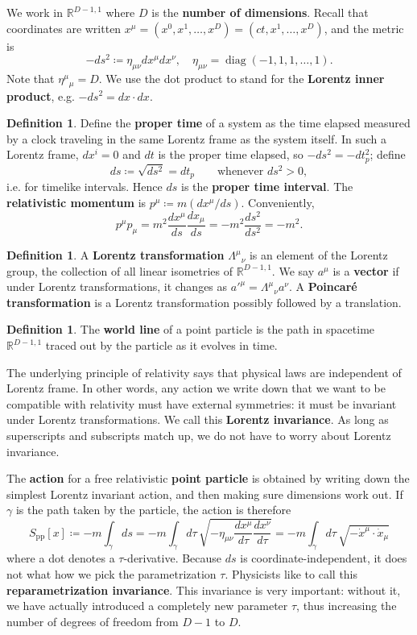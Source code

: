 \documentclass{report}
\theoremstyle{plain}
\theoremstyle{definition}
\newtheorem{definition}[theorem]{Definition}
\theoremstyle{remark}
\newcommand{\bR}{\mathbb{R}}
\DeclareMathOperator{\diag}{diag}
\newcommand{\pp}{\text{pp}}
\newcommand{\dder}[2]{\frac{d #1}{d #2}}
\begin{document}
We work in $\bR^{D-1,1}$ where $D$ is the {\bf number of dimensions}.
Recall that coordinates are written $x^\mu = (x^0, x^1, \ldots, x^D) =
(ct, x^1, \ldots, x^D)$, and the metric is
\[ -ds^2 \coloneqq \eta_{\mu\nu} dx^\mu dx^\nu, \quad \eta_{\mu\nu} = \diag(-1, 1, 1, \ldots, 1). \]
Note that $\eta^\mu{}_\mu = D$. We use the dot product to stand for
the {\bf Lorentz inner product}, e.g. $-ds^2 = dx \cdot dx$.

\begin{definition}
  Define the {\bf proper time} of a system as the time elapsed
  measured by a clock traveling in the same Lorentz frame as the
  system itself. In such a Lorentz frame, $dx^i = 0$ and $dt$ is the
  proper time elapsed, so $-ds^2 = -dt_p^2$; define
  \[ ds \coloneqq \sqrt{ds^2} = dt_p \qquad \text{whenever } ds^2 > 0, \]
  i.e. for timelike intervals. Hence $ds$ is the {\bf proper time
    interval}. The {\bf relativistic momentum} is $p^\mu \coloneqq
  m(dx^\mu/ds)$. Conveniently,
  \[ p^\mu p_\mu = m^2\dder{x^\mu}{s} \dder{x_\mu}{s} = -m^2 \dder{s^2}{s^2} = -m^2. \]
\end{definition}

\begin{definition}
  A {\bf Lorentz transformation} $\Lambda^\mu{}_\nu$ is an element of
  the Lorentz group, the collection of all linear isometries of
  $\bR^{D-1,1}$. We say $a^\mu$ is a {\bf vector} if under Lorentz
  transformations, it changes as $a'^\mu = \Lambda^\mu{}_\nu a^\nu$. A
  {\bf Poincar\'e transformation} is a Lorentz transformation possibly
  followed by a translation.
\end{definition}

\begin{definition}
  The {\bf world line} of a point particle is the path in spacetime
  $\bR^{D-1,1}$ traced out by the particle as it evolves in time.
\end{definition}

The underlying principle of relativity says that physical laws are
independent of Lorentz frame. In other words, any action we write down
that we want to be compatible with relativity must have external
symmetries: it must be invariant under Lorentz transformations. We
call this {\bf Lorentz invariance}. As long as superscripts and
subscripts match up, we do not have to worry about Lorentz invariance.

The {\bf action} for a free relativistic {\bf point particle} is
obtained by writing down the simplest Lorentz invariant action, and
then making sure dimensions work out. If $\gamma$ is the path taken by
the particle, the action is therefore
\[ S_{\pp}[x] \coloneqq -m\int_\gamma ds = -m\int_\gamma d\tau \, \sqrt{-\eta_{\mu\nu} \dder{x^\mu}{\tau} \dder{x^\nu}{\tau}} = -m\int_\gamma d\tau \, \sqrt{-\dot{x}^\mu \cdot \dot{x}_\mu} \]
where a dot denotes a $\tau$-derivative. Because $ds$ is
coordinate-independent, it does not what how we pick the
parametrization $\tau$. Physicists like to call this {\bf
  reparametrization invariance}. This invariance is very important:
without it, we have actually introduced a completely new parameter
$\tau$, thus increasing the number of degrees of freedom from $D-1$ to
$D$.
\end{document}
